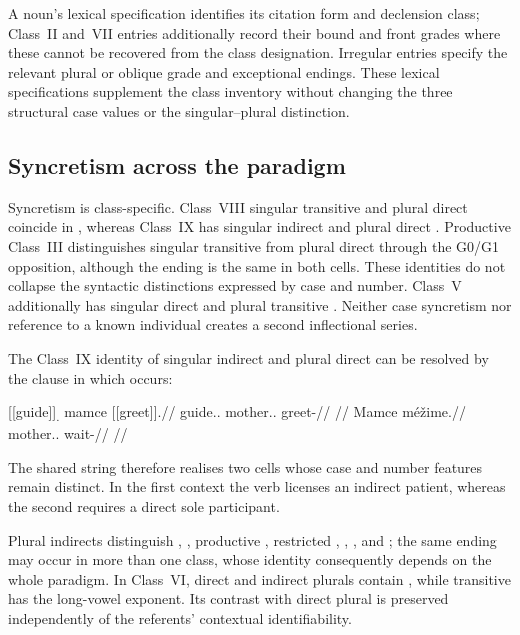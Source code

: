 A noun's lexical specification identifies its citation form and declension class;
Class~II and~VII entries additionally record their bound and front grades
where these cannot be recovered from the class designation. Irregular entries
specify the relevant plural or oblique grade and exceptional endings. These
lexical specifications supplement the class inventory without changing the
three structural case values or the singular--plural distinction.


\FloatBarrier

\subsection{Syncretism across the paradigm}
\label{sec:nm-syncretism}

Syncretism is class-specific. Class~VIII singular transitive and plural direct
coincide in , whereas Class~IX has singular indirect and plural
direct . Productive Class~III distinguishes singular transitive
 from plural direct  through the G0/G1 opposition,
although the ending is the same in both cells.
These identities do not collapse the syntactic distinctions expressed by case
and number. Class~V additionally has singular direct and plural transitive
. Neither case syncretism nor reference to a known individual
creates a second inflectional series.

The Class~IX identity of singular indirect and plural direct can be
resolved by the clause in which  occurs:

\pex\label{ex:nm-slot-syncretism}
\a
\begingl
\gla \textnormal{[[guide]]}\textsubscript{\Dir{}.\Sg{}} mamce \textnormal{[[greet]]}\textsubscript{\Prog{}}.//
\glb guide.\Dir{}.\Sg{} mother.\Ind{}.\Sg{} greet-\Prog{}//
\glft {} //
\endgl
\a
\begingl
\gla Mamce méžime.//
\glb mother.\Dir{}.\Pl{} wait-\Prog{}//
\glft {} //
\endgl
\xe

The shared string therefore realises two cells whose case and number
features remain distinct. In the first context the verb licenses an indirect
patient, whereas the second requires a direct sole participant.

Plural indirects distinguish , , productive ,
restricted , ,
, and ; the same ending may occur in more than one
class, whose identity consequently depends on the whole paradigm. In
Class~VI, direct and indirect plurals contain , while transitive
 has the long-vowel exponent. Its contrast with direct plural
 is preserved independently of the referents' contextual
identifiability.

